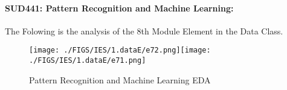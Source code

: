 \documentclass[12pt]{extreport}
\begin{document}
\paragraph{\large SUD441: Pattern Recognition and Machine Learning:\\
}
The Folowing is the analysis of the 8th Module Element in the Data Class.

\begin{figure}[H]
	\centering
	\texttt{[image: ./FIGS/IES/1.dataE/e72.png]}\texttt{[image: ./FIGS/IES/1.dataE/e71.png]}
	\caption{Pattern Recognition and Machine Learning EDA}
	\label{fig:13}
\end{figure}


\begin{comment}


\subparagraph{Interpretation of the Box-plots:}

The numbers Below and the boxplots above show that in this element  PSI and TSI students performance is roughly equivalent
and that their performance is almost better than half of the MP students.

\begin{enumerate}
	\item The MP Class Box-Plot:
	\begin{enumerate}
		\item MAX = 17 {} {} {} {} {} {} {} {} UQ = 16.25 {} {} {} {} {} {} {} {} Median = 16
		\item LQ = 15.5 {} {} {} {} {} {} {} {} MIN = 15 {} {} {} {} {} {} {} {} IQR = 16.26 - 15.5 = 0.75	
	\end{enumerate}
	\item The PSI Class Box-Plot:
	\begin{enumerate}
		\item MAX = 17 {} {} {} {} {} {} {} {} UQ = 16.25 {} {} {} {} {} {} {} {} Median = 16	
		\item LQ = 15.75 {} {} {} {} {} {} {} {} MIN = 15 {} {} {} {} {} {} {} {} IQR = 16.25 - 15.75 = 0.5	
	\end{enumerate}
	\item The TSI Class Box-Plot:
	\begin{enumerate}
		\item MAX = 16 {} {} {} {} {} {} {} {} UQ = 15.5 {} {} {} {} {} {} {} {} Median = 15	
		\item LQ = 12.5 {} {} {} {} {} {} {} {}  MIN = 11 {} {} {} {} {} {} {} {} IQR = 15.5 - 12.5 = 3
	\end{enumerate}
\end{enumerate}



\end{comment}
\end{document}
